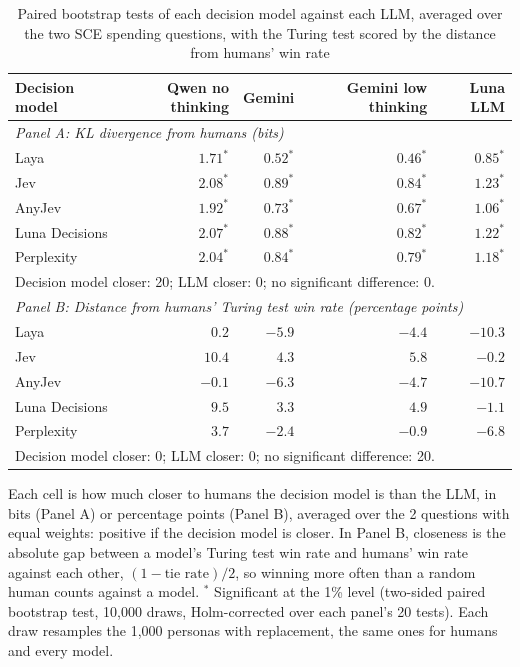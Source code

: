 \begin{table}[htbp]
\centering
\caption{Paired bootstrap tests of each decision model against each LLM, averaged over the two SCE spending questions, with the Turing test scored by the distance from humans' win rate}
\label{tab:sce_bootstrap_2}
\begin{tabular}{lrrrr}
\toprule
Decision model & Qwen no thinking & Gemini & Gemini low thinking & Luna LLM \\
\midrule
\multicolumn{5}{l}{\textit{Panel A: KL divergence from humans (bits)}} \\
\midrule
Laya & $1.71^{*}$ & $0.52^{*}$ & $0.46^{*}$ & $0.85^{*}$ \\
Jev & $2.08^{*}$ & $0.89^{*}$ & $0.84^{*}$ & $1.23^{*}$ \\
AnyJev & $1.92^{*}$ & $0.73^{*}$ & $0.67^{*}$ & $1.06^{*}$ \\
Luna Decisions & $2.07^{*}$ & $0.88^{*}$ & $0.82^{*}$ & $1.22^{*}$ \\
Perplexity & $2.04^{*}$ & $0.84^{*}$ & $0.79^{*}$ & $1.18^{*}$ \\
\multicolumn{5}{l}{\footnotesize Decision model closer: 20; LLM closer: 0; no significant difference: 0.} \\
\midrule
\multicolumn{5}{l}{\textit{Panel B: Distance from humans' Turing test win rate (percentage points)}} \\
\midrule
Laya & $0.2$ & $-5.9$ & $-4.4$ & $-10.3$ \\
Jev & $10.4$ & $4.3$ & $5.8$ & $-0.2$ \\
AnyJev & $-0.1$ & $-6.3$ & $-4.7$ & $-10.7$ \\
Luna Decisions & $9.5$ & $3.3$ & $4.9$ & $-1.1$ \\
Perplexity & $3.7$ & $-2.4$ & $-0.9$ & $-6.8$ \\
\multicolumn{5}{l}{\footnotesize Decision model closer: 0; LLM closer: 0; no significant difference: 20.} \\
\bottomrule
\end{tabular}
\par\smallskip
\parbox{\linewidth}{\footnotesize Each cell is how much closer to humans the decision model is than the LLM, in bits (Panel A) or percentage points (Panel B), averaged over the 2 questions with equal weights: positive if the decision model is closer. In Panel B, closeness is the absolute gap between a model's Turing test win rate and humans' win rate against each other, $(1 - \text{tie rate})/2$, so winning more often than a random human counts against a model. $^{*}$ Significant at the 1\% level (two-sided paired bootstrap test, 10,000 draws, Holm-corrected over each panel's 20 tests). Each draw resamples the 1,000 personas with replacement, the same ones for humans and every model.}
\end{table}
